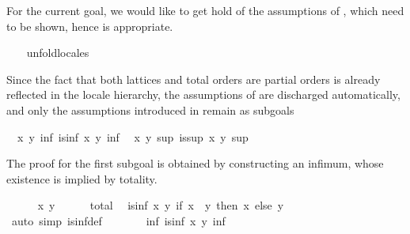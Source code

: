 \begin{isabellebody}
\begin{isamarkuptxt}
  For the current goal, we would like to get hold of
  the assumptions of , which need to be shown, hence
   is appropriate.%
\end{isamarkuptxt}%
\isamarkuptrue%
\ \ \isamarkupfalse%
\ unfold{}locales%
\begin{isamarkuptxt}%
\normalsize
  Since the fact that both lattices and total orders are partial
  orders is already reflected in the locale hierarchy, the assumptions
  of  are discharged automatically, and only the
  assumptions introduced in  remain as subgoals
  \begin{isabelle}%
\ {}{}\ {}x\ y{}\ {}inf{}\ is{}inf\ x\ y\ inf\isanewline
\ {}{}\ {}x\ y{}\ {}sup{}\ is{}sup\ x\ y\ sup%
\end{isabelle}
  The proof for the first subgoal is obtained by constructing an
  infimum, whose existence is implied by totality.%
\end{isamarkuptxt}%
\isamarkuptrue%
\ \ \ \ \isamarkupfalse%
\ x\ y\isanewline
\ \ \ \ \isamarkupfalse%
\ total\ \isamarkupfalse%
\ {}is{}inf\ x\ y\ {}if\ x\ {}\ y\ then\ x\ else\ y{}{}\isanewline
\ \ \ \ \ \ \isamarkupfalse%
\ {}auto\ simp{}\ is{}inf{}def{}\isanewline
\ \ \ \ \isamarkupfalse%
\ \isamarkupfalse%
\ {}{}inf{}\ is{}inf\ x\ y\ inf{}\ \isamarkupfalse%

\end{isabellebody}
